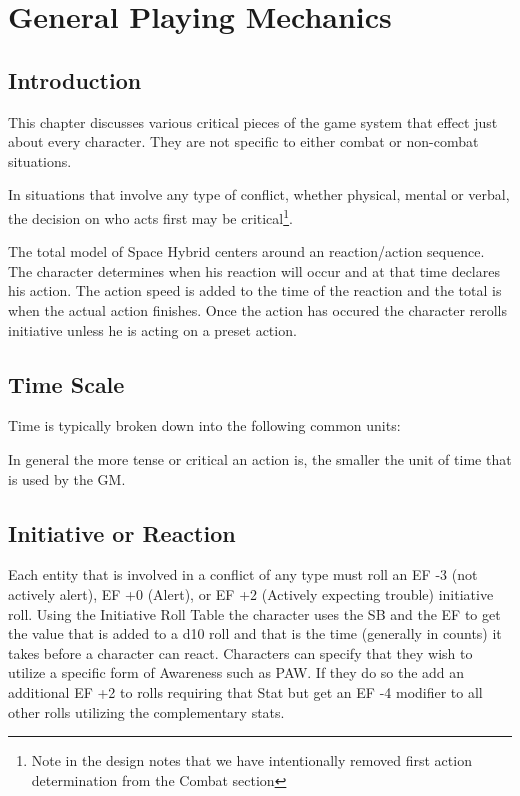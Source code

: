 \chapter{General Playing Mechanics}

\section{Introduction}

This chapter discusses various critical pieces of the game system that 
effect just about every character. They are not specific to either 
combat or non-combat situations. 

In situations that involve any type of conflict, whether physical, 
mental or verbal, the decision on who acts first may be 
critical\footnote{ Note in the design notes that we have intentionally 
removed first action determination from the Combat section}.

The total model of Space Hybrid centers around an reaction/action sequence.
The character determines when his reaction will occur and at that time 
declares his action. The action speed is added to the time of the reaction 
and the total is when the actual action finishes. Once the action has 
occured the character rerolls initiative unless he is acting on a
preset action. 

\section{Time Scale}

Time is typically broken down into the following common units:



In general the more tense or critical an action is, the smaller the unit
of time that is used by the GM. 

\section{Initiative or Reaction}

Each entity that is involved in a conflict of any type must roll an 
EF -3 (not actively alert), EF +0 (Alert),  or EF +2 (Actively 
expecting trouble) initiative roll. Using the Initiative Roll Table 
the character uses the SB and the EF to get the value that is added to a
d10 roll and that is the time (generally in counts) it takes before a
character can react. Characters can specify that they wish to utilize 
a specific form of Awareness such as PAW. If they do so the add an 
additional EF +2 to rolls requiring that Stat but get an EF -4 
modifier to all other rolls utilizing the complementary stats. 

